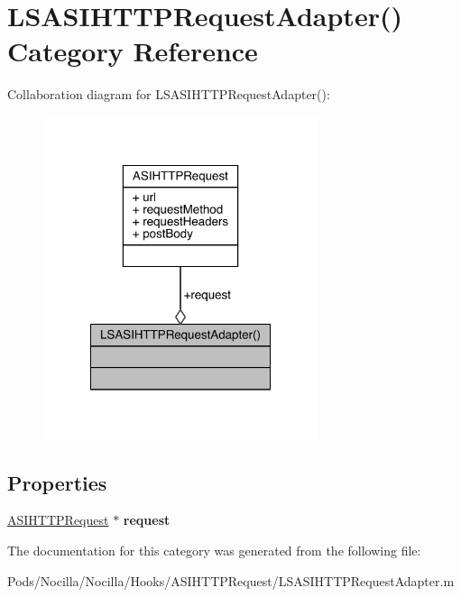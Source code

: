 \hypertarget{category_l_s_a_s_i_h_t_t_p_request_adapter_07_08}{\section{L\-S\-A\-S\-I\-H\-T\-T\-P\-Request\-Adapter() Category Reference}
\label{category_l_s_a_s_i_h_t_t_p_request_adapter_07_08}
}


Collaboration diagram for L\-S\-A\-S\-I\-H\-T\-T\-P\-Request\-Adapter()\-:\nopagebreak
\begin{figure}[H]
\begin{center}
\leavevmode
\includegraphics[width=228pt]{category_l_s_a_s_i_h_t_t_p_request_adapter_07_08__coll__graph}
\end{center}
\end{figure}
\subsection*{Properties}
\begin{DoxyCompactItemize}
\item 
\hypertarget{category_l_s_a_s_i_h_t_t_p_request_adapter_07_08_a7158a8ac0b90b0158a7fdd11017ca988}{\hyperlink{interface_a_s_i_h_t_t_p_request}{A\-S\-I\-H\-T\-T\-P\-Request} $\ast$ {\bfseries request}}\label{category_l_s_a_s_i_h_t_t_p_request_adapter_07_08_a7158a8ac0b90b0158a7fdd11017ca988}

\end{DoxyCompactItemize}


The documentation for this category was generated from the following file\-:\begin{DoxyCompactItemize}
\item 
Pods/\-Nocilla/\-Nocilla/\-Hooks/\-A\-S\-I\-H\-T\-T\-P\-Request/L\-S\-A\-S\-I\-H\-T\-T\-P\-Request\-Adapter.\-m\end{DoxyCompactItemize}

